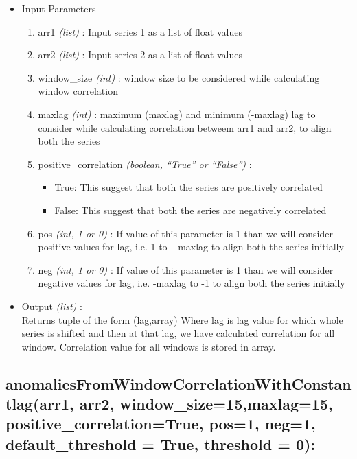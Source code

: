 \begin{itemize}
 \item Input Parameters
 
 \begin{enumerate}
  \item arr1 \textit{(list)} : Input series 1 as a list of float values
  \item arr2 \textit{(list)} : Input series 2 as a list of float values
  \item window\_size \textit{(int)} : window size to be considered while 
calculating window correlation
  \item maxlag \textit{(int)} : maximum (maxlag) and minimum (-maxlag) lag to 
consider while calculating correlation betweem arr1 and arr2, to align both the 
series
  \item positive\_correlation \textit{(boolean, ``True'' or ``False'')} : 
      \begin{itemize}
       \item True: This suggest that both the series are positively correlated
       \item False: This suggest that both the series are negatively correlated
      \end{itemize}
      
  \item pos \textit{(int, 1 or 0)} : If value of this parameter is 1 than we 
will consider positive values for lag, i.e. 1 to +maxlag to align both the 
series initially
  \item neg \textit{(int, 1 or 0)} : If value of this parameter is 1 than we 
will consider negative values for lag, i.e. -maxlag to -1 to align both the 
series initially
  
 \end{enumerate}

 \item Output \textit{(list)} : \\
  Returns tuple of the form (lag,array)
Where lag is lag value for which whole series is shifted and then at that lag, 
we have calculated correlation for all window. Correlation value for all 
windows is stored in array.
 
\end{itemize}

\subsection{anomaliesFromWindowCorrelationWithConstantlag(arr1, arr2, 
window\_size=15,maxlag=15, positive\_correlation=True, pos=1, neg=1, 
default\_threshold = True, threshold = 0):}



